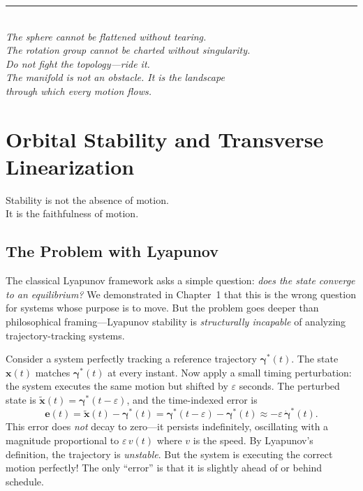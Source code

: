\documentclass[12pt, openany]{book}
\theoremstyle{plain}
\newcommand{\state}{\bm{x}}
\newcommand{\traj}{\bm{\gamma}}
\begin{document}
\vspace{1cm}
\begin{center}
  \rule{0.5\textwidth}{0.4pt}\\[0.5cm]
  {\small\itshape
  The sphere cannot be flattened without tearing.\\
  The rotation group cannot be charted without singularity.\\
  Do not fight the topology---ride it.\\[0.3cm]
  The manifold is not an obstacle. It is the landscape\\
  through which every motion flows.}
\end{center}

\chapter{Orbital Stability and Transverse Linearization}

\epigraph{%
  Stability is not the absence of motion.\\
  It is the faithfulness of motion.
}{}

\vspace{0.5cm}

\section{The Problem with Lyapunov}

The classical Lyapunov framework asks a simple question: \emph{does the state
converge to an equilibrium?} We demonstrated in Chapter~1 that this is the
wrong question for systems whose purpose is to move. But the problem goes
deeper than philosophical framing---Lyapunov stability is \emph{structurally
incapable} of analyzing trajectory-tracking systems.

Consider a system perfectly tracking a reference trajectory $\traj^*(t)$.
The state $\state(t)$ matches $\traj^*(t)$ at every instant. Now apply a
small timing perturbation: the system executes the same motion but shifted
by $\varepsilon$ seconds. The perturbed state is $\tilde{\state}(t) =
\traj^*(t - \varepsilon)$, and the time-indexed error is
\begin{equation}\label{eq:timing_error}
  \bm{e}(t) = \tilde{\state}(t) - \traj^*(t)
  = \traj^*(t - \varepsilon) - \traj^*(t)
  \approx -\varepsilon\, \dot{\traj}^*(t).
\end{equation}
This error does \emph{not} decay to zero---it persists indefinitely,
oscillating with a magnitude proportional to $\varepsilon\, v(t)$ where $v$
is the speed. By Lyapunov's definition, the trajectory is \emph{unstable}.
But the system is executing the correct motion perfectly! The only
``error'' is that it is slightly ahead of or behind schedule.
\end{document}
